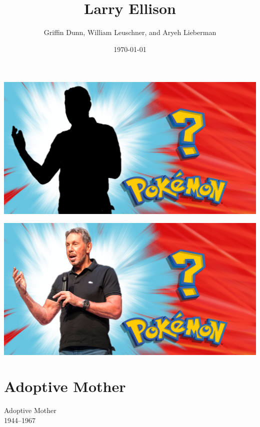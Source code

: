 \documentclass[draft,aspectratio=32]{beamer}
\title{Larry Ellison}
\date{\today}
\author{Griffin Dunn, William Leuschner, and Aryeh Lieberman}
\institute{Rochester Institute of Technology}
\begin{document}
\begin{frame}
    \begin{center}
        \includegraphics[width=\paperwidth]{pokemon_silhouette}
    \end{center}
\end{frame}
\begin{frame}
    \begin{center}
        \includegraphics[width=\paperwidth]{pokemon_larry}
    \end{center}
\end{frame}

\maketitle

\section{Adoptive Mother}

\begin{frame}[standout]
    Adoptive Mother \\
    1944--1967
\end{frame}
\end{document}

